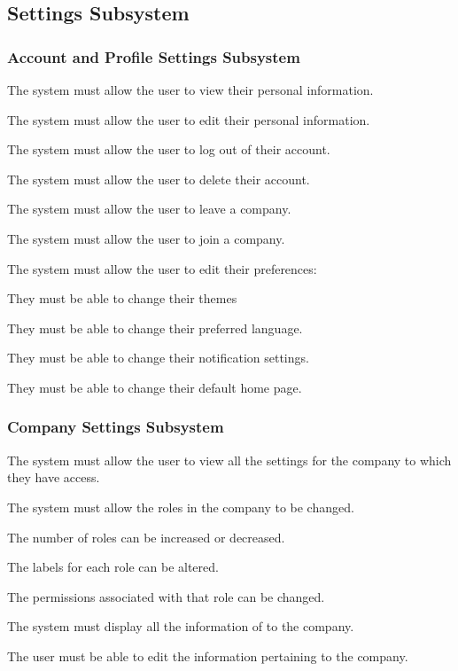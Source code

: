 \documentclass{article}
\begin{document}
	\subsection*{Settings Subsystem}	
	\subsubsection*{Account and Profile Settings Subsystem}	
	\begin{list}{R.}{}
		\item The system must allow the user to view their personal information. 
		\item The system must allow the user to edit their personal information.
		\item The system must allow the user to log out of their account.
		\item The system must allow the user to delete their account.
		\item The system must allow the user to leave a company.
		\item The system must allow the user to join a company.
		\item The system must allow the user to edit their preferences: 
		\begin{list}{R.}{}
			\item They must be able to change their themes
			\item They must be able to change their preferred language.
			\item They must be able to change their notification settings.
			\item They must be able to change their default home page.
		\end{list}
	\end{list}
	\subsubsection*{Company Settings Subsystem}	
	\begin{list}{R.}{}
		\item The system must allow the user to view all the settings for the company to which they have access.
		\item The system must allow the roles in the company to be changed.
		\begin{list}{R.}{}
			\item The number of roles can be increased or decreased.
			\item The labels for each role can be altered.
			\item The permissions associated with that role can be changed.
		\end{list}
		\item The system must display all the information of to the company.
		\item The user must be able to edit the information pertaining to the company.
	\end{list}
	
\end{document}
